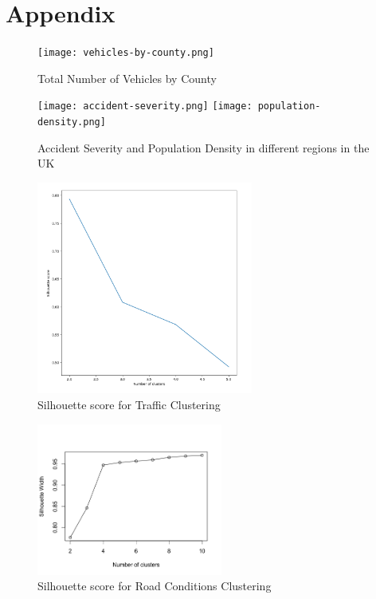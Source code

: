 \documentclass{neu_handout}
\begin{document}
 
\section{Appendix}
\begin{figure}[!htb]
  \texttt{[image: vehicles-by-county.png]}
  \caption{Total Number of Vehicles by County}
\end{figure}


\begin{figure}[!htb]
  \texttt{[image: accident-severity.png]}
\endminipage\hfill
{}
  \texttt{[image: population-density.png]}
  \endminipage
\caption{Accident Severity and Population Density in different regions in the UK}  
\end{figure}

\begin{figure}[!htb]
    \begin{center}
      \includegraphics[height=7cm]{silhouette-score-traffic.png}
      \caption{Silhouette score for Traffic Clustering}
    \end{center}
\end{figure}

\begin{figure}[!htb]
    \begin{center}
      \includegraphics[height=5cm]{silhouette_road_conditions.png}
      \caption{Silhouette score for Road Conditions Clustering}
    \end{center}
\end{figure}
\end{document}
